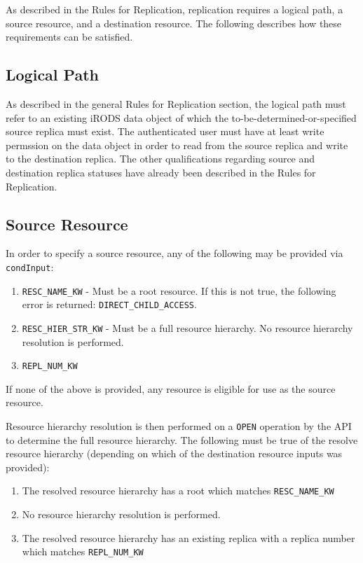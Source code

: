 \documentclass{irodsugm}
\begin{document}
As described in the Rules for Replication, replication requires a logical path, a source resource, and a destination resource. The following describes how these requirements can be satisfied.

\subsection*{Logical Path}
As described in the general Rules for Replication section, the logical path must refer to an existing iRODS data object of which the to-be-determined-or-specified source replica must exist. The authenticated user must have at least write permssion on the data object in order to read from the source replica and write to the destination replica. The other qualifications regarding source and destination replica statuses have already been described in the Rules for Replication.

\subsection*{Source Resource}
In order to specify a source resource, any of the following may be provided via \texttt{condInput}:

\begin{enumerate}
    \item \texttt{RESC\_NAME\_KW} - Must be a root resource. If this is not true, the following error is returned: \texttt{DIRECT\_CHILD\_ACCESS}.
    \item \texttt{RESC\_HIER\_STR\_KW} - Must be a full resource hierarchy. No resource hierarchy resolution is performed.
    \item \texttt{REPL\_NUM\_KW}
\end{enumerate}

If none of the above is provided, any resource is eligible for use as the source resource.

Resource hierarchy resolution is then performed on a \texttt{OPEN} operation by the API to determine the full resource hierarchy. The following must be true of the resolve resource hierarchy (depending on which of the destination resource inputs was provided):

\begin{enumerate}
    \item The resolved resource hierarchy has a root which matches \texttt{RESC\_NAME\_KW}
    \item No resource hierarchy resolution is performed.
    \item The resolved resource hierarchy has an existing replica with a replica number which matches \texttt{REPL\_NUM\_KW}
\end{enumerate}
\end{document}
